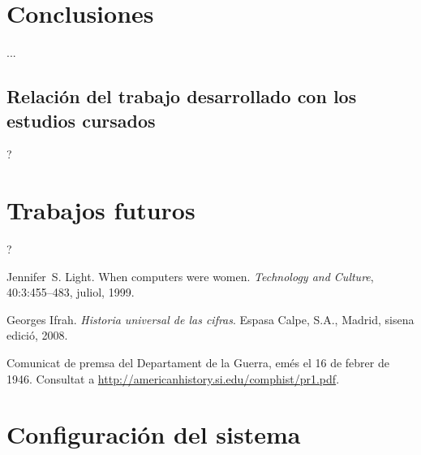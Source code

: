 \documentclass[11pt,spanish,listoffigures,listoftables]{tfgetsinf}
\begin{document}
\chapter{Conclusiones}

... \par

\section{Relación del trabajo desarrollado con los estudios cursados}

?

\chapter{Trabajos futuros}

?

\begin{thebibliography}{10}

   Jennifer~S. Light.
   \newblock When computers were women.
   \newblock \textit{Technology and Culture}, 40:3:455--483, juliol, 1999.

   Georges Ifrah.
   \newblock \textit{Historia universal de las cifras}.
   \newblock Espasa Calpe, S.A., Madrid, sisena edició, 2008.

   Comunicat de premsa del Departament de la Guerra, 
   emés el 16 de febrer de 1946. 
   \newblock Consultat a 
   \url{http://americanhistory.si.edu/comphist/pr1.pdf}.

\end{thebibliography}
\cleardoublepage

\APPENDIX

\chapter{Configuración del sistema}
\end{document}
